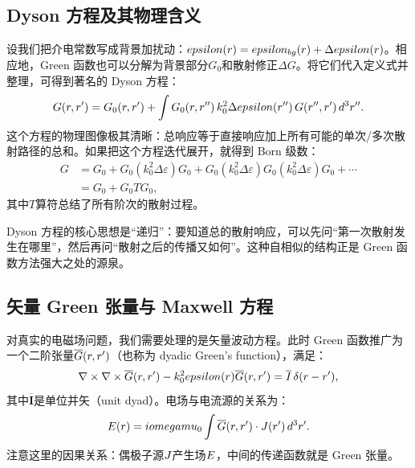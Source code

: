 \subsection{Dyson 方程及其物理含义}
设我们把介电常数写成背景加扰动：$epsilon(r)=epsilon_{bg}(r)+\Delta epsilon(r)$。相应地，Green 函数也可以分解为背景部分$G_0$和散射修正$\Delta G$。将它们代入定义式并整理，可得到著名的 Dyson 方程：
\begin{equation}
G(r,r') = G_0(r,r') + \int G_0(r,r'')\,k_0^2\Delta epsilon(r'')\,G(r'',r')\,d^3 r''.
\label{eq:dyson_equation_scalar}
\end{equation}
这个方程的物理图像极其清晰：总响应等于直接响应加上所有可能的单次/多次散射路径的总和。如果把这个方程迭代展开，就得到 Born 级数：
\begin{align}
G &= G_0 + G_0(k_0^2\Delta\varepsilon)G_0 + G_0(k_0^2\Delta\varepsilon)G_0(k_0^2\Delta\varepsilon)G_0 + \cdots \\
  &= G_0 + G_0 T G_0,
\end{align}
其中$T$算符总结了所有阶次的散射过程。

Dyson 方程的核心思想是“递归”：要知道总的散射响应，可以先问“第一次散射发生在哪里”，然后再问“散射之后的传播又如何”。这种自相似的结构正是 Green 函数方法强大之处的源泉。

\subsection{矢量 Green 张量与 Maxwell 方程}
对真实的电磁场问题，我们需要处理的是矢量波动方程。此时 Green 函数推广为一个二阶张量$\overline{G}(r,r')$（也称为 dyadic Green's function），满足：
\begin{equation}
\nabla\times\nabla\times\overline{G}(r,r') - k_0^2epsilon(r)\overline{G}(r,r') = \overline{I}\,\delta(r-r'),
\label{eq:dyadic_green_definition}
\end{equation}
其中$\overline{\bm{I}}$是单位并矢（unit dyad）。电场与电流源的关系为：
\begin{equation}
E(r) = iomegamu_0 \int \overline{G}(r,r')\cdot J(r')\,d^3 r'.
\label{eq:E_from_dyadic_green}
\end{equation}
注意这里的因果关系：偶极子源$J$产生场$E$，中间的传递函数就是 Green 张量。

